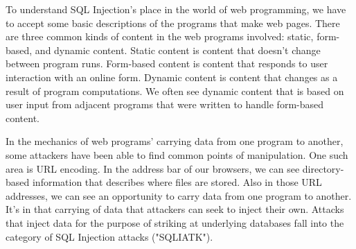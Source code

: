 To understand SQL Injection's place in the world of web programming, we have to accept some basic descriptions of the programs that make web pages.  There are three common kinds of content in the web programs involved:  static, form-based, and dynamic content.  Static content is content that doesn't change between program runs.  Form-based content is content that responds to user interaction with an online form.  Dynamic content is content that changes as a result of program computations.  We often see dynamic content that is based on user input from adjacent programs that were written to handle form-based content.  

In the mechanics of web programs' carrying data from one program to another, some attackers have been able to find common points of manipulation.  One such area is URL encoding.  In the address bar of our browsers, we can see directory-based information that describes where files are stored.  Also in those URL addresses, we can see an opportunity to carry data from one program to another.  It's in that carrying of data that attackers can seek to inject their own.  Attacks that inject data for the purpose of striking at underlying databases fall into the category of SQL Injection attacks ("SQLIATK").   

